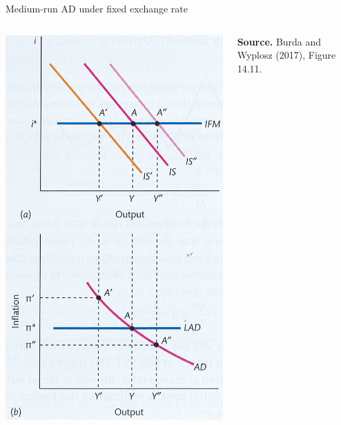 \documentclass{beamer}
\begin{document}
\begin{frame}{Medium-run AD under fixed exchange rate}
\begin{columns}
\centering
\includegraphics[clip,width=1\columnwidth]{FIGURES/9_AD_FixedFX}

\begin{minipage}{1.0\columnwidth}
\tiny	
\textbf{Source.} Burda and Wyplosz (2017), Figure 14.11.\\
\end{minipage}
	
\end{columns} 	 
\end{frame}
\end{document}
